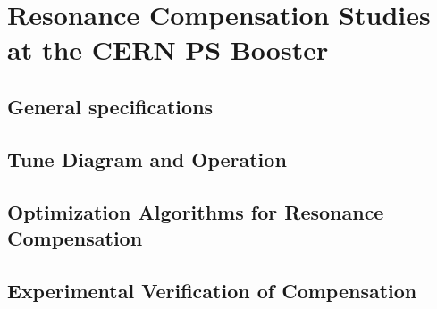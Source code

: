 \chapter{Resonance Compensation Studies at the CERN PS Booster}

\section{General specifications}

\section{Tune Diagram and Operation}

\section{Optimization Algorithms for Resonance Compensation}

\section{Experimental Verification of Compensation}
